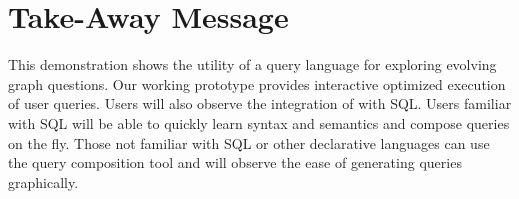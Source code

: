 \section{Take-Away Message}
\label{sec:conc}

This demonstration shows the utility of a query language for exploring
evolving graph questions.  Our working prototype provides interactive
optimized execution of user queries.  Users will also observe the
integration of \ql with SQL.  Users familiar with SQL will be able to
quickly learn \ql syntax and semantics and compose queries on the fly.
Those not familiar with SQL or other declarative languages can use the
query composition tool and will observe the ease of generating queries
graphically.
